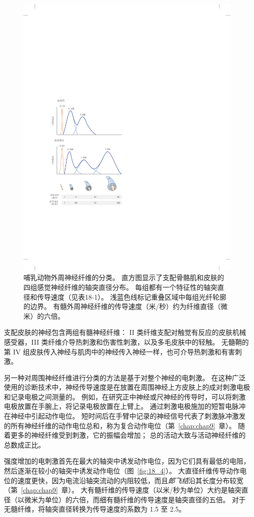 \begin{figure}[htbp]
	\centering
	\includegraphics[width=0.6\linewidth]{chap18/fig_18_3}
	\caption{哺乳动物外周神经纤维的分类。
	直方图显示了支配骨骼肌和皮肤的四组感觉神经纤维的轴突直径分布。
	每组都有一个特征性的轴突直径和传导速度（见表18-1）。
	浅蓝色线标记重叠区域中每组光纤轮廓的边界。
	有髓外周神经纤维的传导速度（米/秒）约为纤维直径（微米）的六倍。}
	\label{fig:18_3}
\end{figure}



支配皮肤的神经包含两组有髓神经纤维：
II 类纤维支配对触觉有反应的皮肤机械感受器，III 类纤维介导热刺激和伤害性刺激，以及多毛皮肤中的轻触。
无髓鞘的第 IV 组皮肤传入神经与肌肉中的神经传入神经一样，也可介导热刺激和有害刺激。


另一种对周围神经纤维进行分类的方法是基于对整个神经的电刺激。
在这种广泛使用的诊断技术中，神经传导速度是在放置在周围神经上方皮肤上的成对刺激电极和记录电极之间测量的。
例如，在研究正中神经或尺神经的传导时，可以将刺激电极放置在手腕上，将记录电极放置在上臂上。
通过刺激电极施加的短暂电脉冲在神经中引起动作电位。
短时间后在手臂中记录的神经信号代表了刺激脉冲激发的所有神经纤维的动作电位总和，称为复合动作电位（第~\ref{chap:chap9}~章）。
随着更多的神经纤维受到刺激，它的振幅会增加；
总的活动大致与活动神经纤维的总数成正比。


强度增加的电刺激首先在最大的轴突中诱发动作电位，因为它们具有最低的电阻，然后逐渐在较小的轴突中诱发动作电位（图~\ref{fig:18_4}）。
大直径纤维传导动作电位的速度更快，因为电流沿轴突流动的内阻较低，而且\textit{郎飞结}沿其长度分布较宽（第~\ref{chap:chap9}~章）。
大有髓纤维的传导速度（以米/秒为单位）大约是轴突直径（以微米为单位）的六倍，而细有髓纤维的传导速度是轴突直径的五倍。
对于无髓纤维，将轴突直径转换为传导速度的系数为 1.5 至 2.5。


